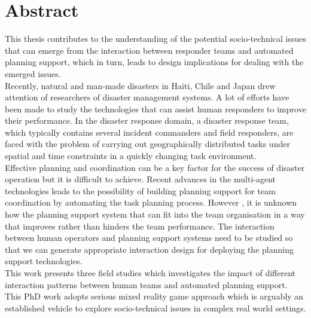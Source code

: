\begingroup
\let\clearpage\relax
\let\cleardoublepage\relax
\let\cleardoublepage\relax

\chapter*{Abstract}
This thesis contributes to the understanding of the potential socio-technical issues that can emerge from the interaction between responder teams and automated planning support, which in turn, leads to design implications for dealing with the emerged issues. \\

Recently, natural and man-made disasters in Haiti, Chile and Japan drew attention of researchers of disaster management systems. A lot of efforts have been made to study the technologies that can assist human responders to improve their performance. In the disaster response domain,  a disaster response team, which typically contains several incident commanders and field responders, are faced with the problem of carrying out geographically distributed tasks under spatial and time constraints in a quickly changing task environment. \\ 

Effective planning and coordination can be a key factor for the success of disaster operation but it is difficult to achieve. Recent advances in the multi-agent technologies leads to the possibility of building planning support for team coordination by automating the task planning process. However , it is unknown how the planning support system that can fit into the team organisation in a way that improves rather than hinders the team performance. The interaction between human operators and planning support systems need to be studied so that we can generate appropriate interaction design for deploying the planning support technologies.\\

This work presents three field studies which investigates the impact of different interaction patterns between human teams and automated  planning support. This PhD work adopts serious mixed reality game approach which is arguably an established vehicle to explore socio-technical issues in complex real world settings.\\

